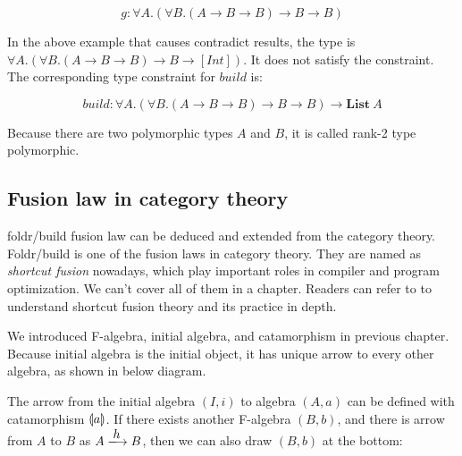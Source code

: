 \documentclass[b5paper]{article}
\begin{document}
\[
g : \forall A. (\forall B. (A \to B \to B) \to B \to B)
\]

In the above example that causes contradict results, the type is $\forall A. (\forall B. (A \to B \to B) \to B \to [Int])$. It does not satisfy the constraint. The corresponding type constraint for $build$ is:

\[
build : \forall A. (\forall B. (A \to B \to B) \to B \to B) \to \mathbf{List}\ A
\]

Because there are two polymorphic types $A$ and $B$, it is called rank-2 type polymorphic.

\subsection{Fusion law in category theory}
foldr/build fusion law can be deduced and extended from the category theory. Foldr/build is one of the fusion laws in category theory. They are named as {\em shortcut fusion} nowadays, which play important roles in compiler and program optimization. We can't cover all of them in a chapter. Readers can refer to \cite{Hinze-Harper-James-2010} to understand shortcut fusion theory and its practice in depth.

We introduced F-algebra, initial algebra, and catamorphism in previous chapter. Because initial algebra is the initial object, it has unique arrow to every other algebra, as shown in below diagram.

\begin{center}
\end{center}

The arrow from the initial algebra $(I, i)$ to algebra $(A, a)$ can be defined with catamorphism $\llparenthesis a \rrparenthesis$. If there exists another F-algebra $(B, b)$, and there is arrow from $A$ to $B$ as $A \arrowto{h} B$, then we can also draw $(B, b)$ at the bottom:
\end{document}
